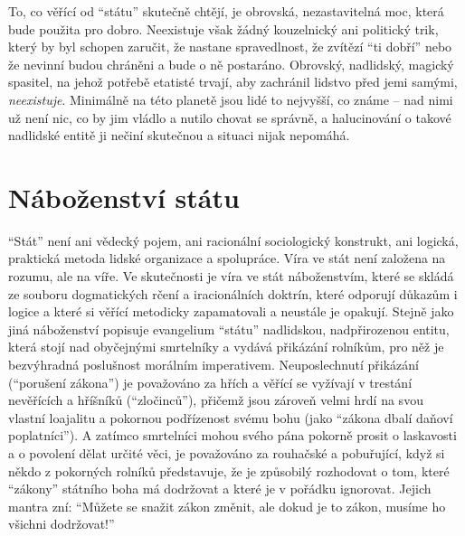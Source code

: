 \documentclass{book}
\begin{document}
To, co věřící od \enquote{státu} skutečně chtějí, je obrovská, nezastavitelná moc, která bude použita pro dobro. Neexistuje však žádný kouzelnický ani politický trik, který by byl schopen zaručit, že nastane spravedlnost, že zvítězí \enquote{ti dobří} nebo že nevinní budou chráněni a bude o ně postaráno. Obrovský, nadlidský, magický spasitel, na jehož potřebě etatisté trvají, aby zachránil lidstvo před jemi samými, \emph{neexistuje}. Minimálně na této planetě jsou lidé to nejvyšší, co známe -- nad nimi už není nic, co by jim vládlo a nutilo chovat se správně, a halucinování o takové nadlidské entitě ji nečiní skutečnou a situaci nijak nepomáhá.

\section{Náboženství státu}

\enquote{Stát} není ani vědecký pojem, ani racionální sociologický konstrukt, ani logická, praktická metoda lidské organizace a spolupráce. Víra ve stát není založena na rozumu, ale na víře. Ve skutečnosti je víra ve stát náboženstvím, které se skládá ze souboru dogmatických rčení a iracionálních doktrín, které odporují důkazům i logice a které si věřící metodicky zapamatovali a neustále je opakují. Stejně jako jiná náboženství popisuje evangelium \enquote{státu} nadlidskou, nadpřirozenou entitu, která stojí nad obyčejnými smrtelníky a vydává přikázání rolníkům, pro něž je bezvýhradná poslušnost morálním imperativem. Neuposlechnutí přikázání (\enquote{porušení zákona}) je považováno za hřích a věřící se vyžívají v trestání nevěřících a hříšníků (\enquote{zločinců}), přičemž jsou zároveň velmi hrdí na svou vlastní loajalitu a pokornou podřízenost svému bohu (jako \enquote{zákona dbalí daňoví poplatníci}). A zatímco smrtelníci mohou svého pána pokorně prosit o laskavosti a o povolení dělat určité věci, je považováno za rouhačské a pobuřující, když si někdo z pokorných rolníků představuje, že je způsobilý rozhodovat o tom, které \enquote{zákony} státního boha má dodržovat a které je v pořádku ignorovat. Jejich mantra zní: \enquote{Můžete se snažit zákon změnit, ale dokud je to zákon, musíme ho všichni dodržovat!}
\end{document}
